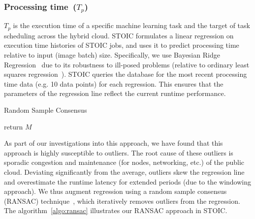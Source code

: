 \subsubsection{Processing time~($T_p$)} 

$T_p$ is the execution time of a specific machine learning task and the target of task scheduling across the hybrid cloud. STOIC formulates a linear regression on execution time histories of STOIC jobs, and uses it to predict processing time relative to input (image batch) size. Specifically, we use Bayesian Ridge Regression~\cite{ref:brr} due to its robustness to ill-posed problems (relative to ordinary least squares regression~\cite{ref:ols}). STOIC queries the database for the most recent processing time data (e.g. 10 data points) for each regression. This ensures that the parameters of the regression line reflect the current runtime performance.

\begin{algorithm}[]
\caption{Random Sample Consensus}
\label{algo:ransac}
\SetAlgoLined
{}
 return $M$
\end{algorithm}
 
As part of our investigations into this approach, we have found that this approach is highly susceptible to outliers. The root cause of these outliers is sporadic congestion and maintenance (for nodes, networking, etc.) of the public cloud. Deviating significantly from the average, outliers skew the regression line and overestimate the runtime latency for extended periods (due to the windowing approach). We thus augment regression using a random sample consensus (RANSAC) technique~\cite{ref:ransac}, which iteratively removes outliers from the regression. The algorithm~\ref{algo:ransac} illustrates our RANSAC approach in STOIC.


